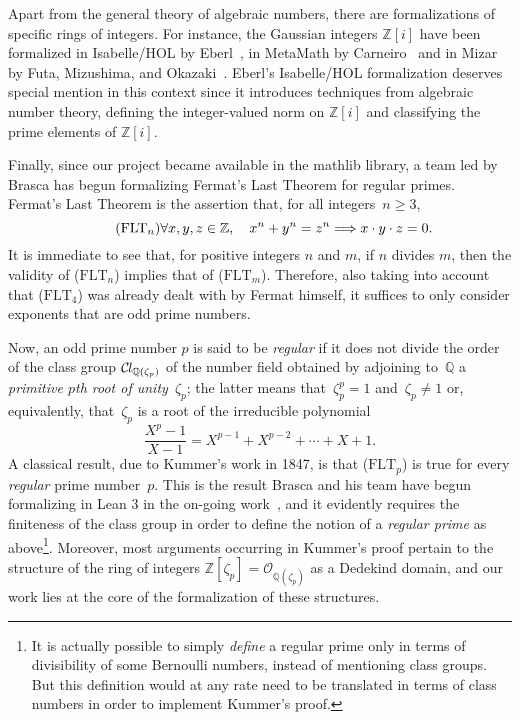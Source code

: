 \documentclass[sn-mathphys]{sn-jnl}%
\newcommand*{\OK}[1][K]{\mathcal{O}_{#1}}
\newcommand*{\Cl}{\mathcal{C}\kern-.075em l}
\newcommand*{\refFLT}[1]{($\mathrm{FLT}_{#1}$)}
\newcommand{\mathlib}{\textsf{mathlib}\xspace}
\newcommand{\QQ}{\mathbb{Q}}
\renewcommand{\Z}{\mathbb{Z}}
\begin{document}
Apart from the general theory of algebraic numbers, there are formalizations of specific rings of integers.
For instance, the Gaussian integers $\Z[i]$ have been formalized
in Isabelle/HOL by Eberl~\cite{gaussian_integers-isabelle},
in MetaMath by Carneiro~\cite{gaussian_integers-metamath}
and in Mizar by Futa, Mizushima, and Okazaki~\cite{gaussian_integers-mizar}.
Eberl's Isabelle/HOL formalization deserves special mention in this context since it introduces techniques from algebraic number theory,
defining the integer-valued norm on $\Z[i]$ and classifying the prime elements of $\Z[i]$.

Finally, since our project became available in the \mathlib library, a team led by Brasca has begun formalizing Fermat's Last Theorem for regular primes. Fermat's Last Theorem is the assertion that, for all integers~$n\geq 3$,
\begin{equation}\tag*{\refFLT{n}}
\forall x,y,z \in \Z, \quad x^n+y^n=z^n\Longrightarrow x\cdot y \cdot z =0.
\end{equation}
It is immediate to see that, for positive integers $n$ and $m$, if $n$ divides $m$, then the validity of \refFLT{n} implies that of \refFLT{m}.
Therefore, also taking into account that \refFLT{4} was already dealt with by Fermat himself, it suffices to only consider exponents that are odd prime numbers.

Now, an odd prime number $p$ is said to be \emph{regular} if it does not divide the order of the class group $\Cl_{\QQ(\zeta_p)}$ of the number field obtained by adjoining to~$\QQ$ a \emph{primitive $p$th root of unity}~$\zeta_p$; the latter means that~$\zeta_p^p=1$ and~$\zeta_p\neq 1$ or, equivalently, that~$\zeta_p$ is a root of the irreducible polynomial
\[
\frac{X^p-1}{X-1}=X^{p-1}+X^{p-2}+\cdots +X+1.
\]
A classical result, due to Kummer's work in 1847, is that \refFLT{p} is true for every \emph{regular} prime number~$p$. This is the result Brasca and his team have begun formalizing in Lean 3 in the on-going work~\cite{Bra22}, and it evidently requires the finiteness of the class group in order to define the notion of a \emph{regular prime} as above\footnote{It is actually possible to simply \emph{define} a regular prime only in terms of divisibility of some Bernoulli numbers, instead of mentioning class groups. But this definition would at any rate need to be translated in terms of class numbers in order to implement Kummer's proof.}. Moreover, most arguments occurring in Kummer's proof pertain to the structure of the ring of integers $\Z[\zeta_p]=\OK[\QQ(\zeta_p)]$ as a Dedekind domain, and our work lies at the core of the formalization of these structures.
\end{document}

